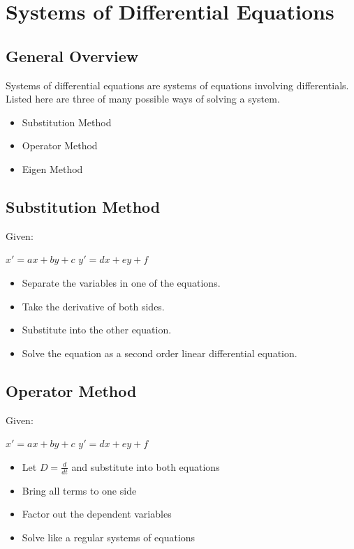 \documentclass[12 pt, oneside]{book}
\begin{document}
\chapter{Systems of Differential Equations}

\section{General Overview}

Systems of differential equations are systems of equations involving differentials. Listed here are three of many possible ways of solving a system.

\begin{itemize}
\item Substitution Method
\item Operator Method
\item Eigen Method
\end{itemize}

\section{Substitution Method}

Given:

$x'=ax+by+c$
$y'=dx+ey+f$

\begin{itemize}
\item Separate the variables in one of the equations.
\item Take the derivative of both sides.
\item Substitute into the other equation.
\item Solve the equation as a second order linear differential equation.
\end{itemize}

\section{Operator Method}

Given:

$x'=ax+by+c$
$y'=dx+ey+f$

\begin{itemize}
\item Let $D=\frac{d}{dt}$ and substitute into both equations
\item Bring all terms to one side
\item Factor out the dependent variables
\item Solve like a regular systems of equations
\end{itemize}
\end{document}
